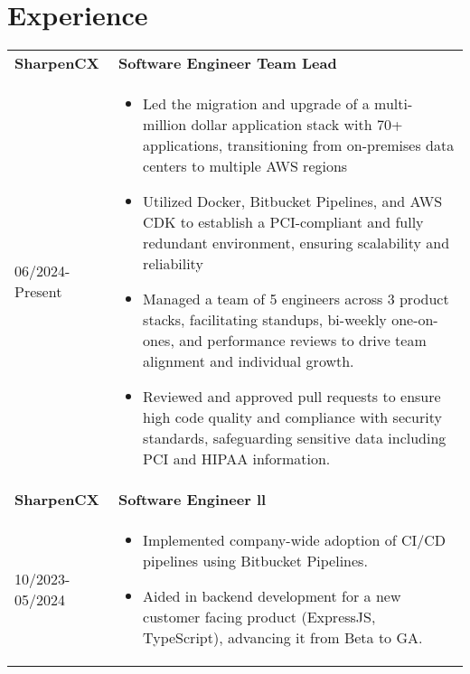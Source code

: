 \documentclass[a4paper,10pt]{article}
\begin{document}
\section*{\textcolor{blueishgray}{Experience}}
\begin{tabularx}{\linewidth}{l|>{\raggedright\arraybackslash}X}
  \textbf{\textcolor{blueishgray}{SharpenCX}} & \textbf{\textcolor{blueishgray}{Software Engineer Team Lead}} \\ {\small \textcolor{datecolor}{06/2024-Present}} & 
  \begin{itemize}[leftmargin=*]
    \item Led the migration and upgrade of a multi-million dollar application stack with 70+ applications, transitioning from on-premises data centers to multiple AWS regions
    \item Utilized Docker, Bitbucket Pipelines, and AWS CDK to establish a PCI-compliant and fully redundant environment, ensuring scalability and reliability
    \item Managed a team of 5 engineers across 3 product stacks, facilitating standups, bi-weekly one-on-ones, and performance reviews to drive team alignment and individual growth.
    \item Reviewed and approved pull requests to ensure high code quality and compliance with security standards, safeguarding sensitive data including PCI and HIPAA information.
  \end{itemize} \\
  \textbf{\textcolor{blueishgray}{SharpenCX}} & \textbf{\textcolor{blueishgray}{Software Engineer ll}} \\ {\small \textcolor{datecolor}{10/2023-05/2024}} &
  \begin{itemize}[leftmargin=*]
    \item Implemented company-wide adoption of CI/CD pipelines using Bitbucket Pipelines. 
    \item Aided in backend development for a new customer facing product (ExpressJS, TypeScript), advancing it from Beta to GA.

\end{itemize}
\end{tabularx}
\end{document}
